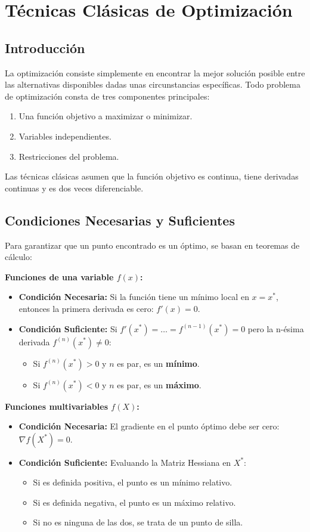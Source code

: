 \documentclass{article}
\begin{document}
	\section{Técnicas Clásicas de Optimización}
	
	\subsection{Introducción}
	La optimización consiste simplemente en encontrar la mejor solución posible entre las alternativas disponibles dadas unas circunstancias específicas. Todo problema de optimización consta de tres componentes principales:
	\begin{enumerate}
		\item Una función objetivo a maximizar o minimizar.
		\item Variables independientes.
		\item Restricciones del problema.
	\end{enumerate}
	Las técnicas clásicas asumen que la función objetivo es continua, tiene derivadas continuas y es dos veces diferenciable.
	
	\subsection{Condiciones Necesarias y Suficientes}
	Para garantizar que un punto encontrado es un óptimo, se basan en teoremas de cálculo:
	
	\textbf{Funciones de una variable $f(x)$:}
	\begin{itemize}
		\item \textbf{Condición Necesaria:} Si la función tiene un mínimo local en $x=x^{*}$, entonces la primera derivada es cero: $f'(x)=0$.
		\item \textbf{Condición Suficiente:} Si $f'(x^{*}) = \dots = f^{(n-1)}(x^{*}) = 0$ pero la n-ésima derivada $f^{(n)}(x^{*}) \neq 0$:
		\begin{itemize}
			\item Si $f^{(n)}(x^{*}) > 0$ y $n$ es par, es un \textbf{mínimo}.
			\item Si $f^{(n)}(x^{*}) < 0$ y $n$ es par, es un \textbf{máximo}.
		\end{itemize}
	\end{itemize}
	
	\textbf{Funciones multivariables $f(X)$:}
	\begin{itemize}
		\item \textbf{Condición Necesaria:} El gradiente en el punto óptimo debe ser cero: $\nabla f(X^{*}) = 0$.
		\item \textbf{Condición Suficiente:} Evaluando la Matriz Hessiana en $X^{*}$:
		\begin{itemize}
			\item Si es definida positiva, el punto es un mínimo relativo.
			\item Si es definida negativa, el punto es un máximo relativo.
			\item Si no es ninguna de las dos, se trata de un punto de silla.
		\end{itemize}
	\end{itemize}
	
\end{document}
